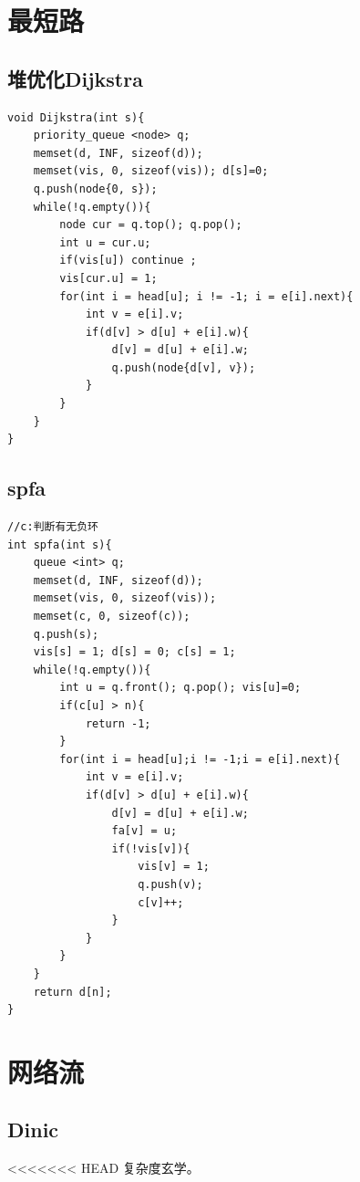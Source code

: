 \documentclass[a4paper,11pt,twoside,fontset = fandol,UTF8]{ctexbook} %
\begin{document}
	\section{最短路}   %
	\subsection{堆优化Dijkstra}
	\begin{lstlisting}
void Dijkstra(int s){
    priority_queue <node> q;
	memset(d, INF, sizeof(d));
    memset(vis, 0, sizeof(vis)); d[s]=0;
    q.push(node{0, s});
    while(!q.empty()){
        node cur = q.top(); q.pop();
        int u = cur.u;
        if(vis[u]) continue ;
        vis[cur.u] = 1;
        for(int i = head[u]; i != -1; i = e[i].next){
            int v = e[i].v;
            if(d[v] > d[u] + e[i].w){
                d[v] = d[u] + e[i].w;
                q.push(node{d[v], v});
            }
        }
    }
}
	\end{lstlisting}
	\subsection{spfa}
	\begin{lstlisting}
//c:判断有无负环
int spfa(int s){
    queue <int> q;
    memset(d, INF, sizeof(d));
    memset(vis, 0, sizeof(vis));
    memset(c, 0, sizeof(c));
    q.push(s);
    vis[s] = 1; d[s] = 0; c[s] = 1;
    while(!q.empty()){
        int u = q.front(); q.pop(); vis[u]=0;
        if(c[u] > n){
            return -1;
        }
        for(int i = head[u];i != -1;i = e[i].next){
            int v = e[i].v;
            if(d[v] > d[u] + e[i].w){
                d[v] = d[u] + e[i].w;
                fa[v] = u;
                if(!vis[v]){
                    vis[v] = 1;
                    q.push(v);
                    c[v]++;
                }
            }
        }
    }
    return d[n];
}
	\end{lstlisting}
	\section{网络流}
	\subsection{Dinic}
<<<<<<< HEAD
复杂度玄学。
\end{document}
